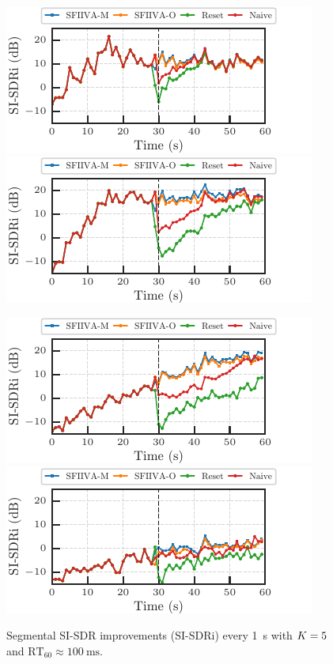 \documentclass[sip,biber]{now-journal}
\begin{document}
\begin{figure}[t]
  \begin{minipage}[t]{.5\textwidth}
    \centering\includegraphics{figures/plots/online/Gauss_8000_fft4096_900.pdf}\label{fig:plot:gauss:900}
    \centering\includegraphics{figures/plots/online/Gauss_8000_fft4096_950.pdf}\label{fig:plot:gauss:950}
  \end{minipage}
  \begin{minipage}[t]{.5\textwidth}
    \centering\includegraphics{figures/plots/online/Gauss_8000_fft4096_980.pdf}\label{fig:plot:gauss:980}
    \centering\includegraphics{figures/plots/online/Gauss_8000_fft4096_990.pdf}\label{fig:plot:gauss:990}
  \end{minipage}
  \caption{Segmental SI-SDR improvements (SI-SDRi) every \SI{1}{\second} with $K = 5$ and $\text{RT}_{60} \approx \SI{100}{\milli\second}$.}%
  \label{fig:plots:sisdr}
\end{figure}
\end{document}
